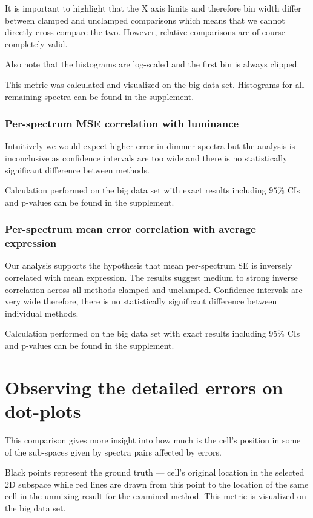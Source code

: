 It is important to highlight that the X axis limits and therefore bin width differ between clamped and unclamped comparisons which means that we cannot directly cross-compare the two. However, relative comparisons are of course completely valid.

Also note that the histograms are log-scaled and the first bin is always clipped.

This metric was calculated and visualized on the big data set. Histograms for all remaining spectra can be found in the supplement.

\subsubsection{Per-spectrum MSE correlation with luminance}

Intuitively we would expect higher error in dimmer spectra but the analysis is inconclusive as confidence intervals are too wide and there is no statistically significant difference between methods.

Calculation performed on the big data set with exact results including $95\%$ CIs and p-values can be found in the supplement.

\subsubsection{Per-spectrum mean error correlation with average expression}

Our analysis supports the hypothesis that mean per-spectrum SE is inversely correlated with mean expression. The results suggest medium to strong inverse correlation across all methods clamped and unclamped. Confidence intervals are very wide therefore, there is no statistically significant difference between individual methods.

Calculation performed on the big data set with exact results including $95\%$ CIs and p-values can be found in the supplement.

\section{Observing the detailed errors on dot-plots}

This comparison gives more insight into how much is the cell's position in some of the sub-spaces given by spectra pairs affected by errors.

Black points represent the ground truth --- cell's original location in the selected 2D subspace while red lines are drawn from this point to the location of the same cell in the unmixing result for the examined method. This metric is visualized on the big data set.

